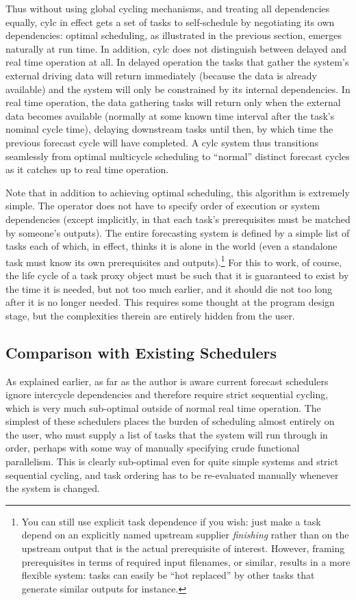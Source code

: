 \documentclass[11pt,a4paper]{article}
\begin{document}
Thus without using global cycling mechanisms, and treating all
dependencies equally, cylc in effect gets a set of tasks to
self-schedule by negotiating its own dependencies: optimal scheduling,
as illustrated in the previous section, emerges naturally at run time.
In addition, cylc does not distinguish between delayed and real time
operation at all. In delayed operation the tasks that gather the
system's external driving data will return immediately (because the data
is already available) and the system will only be constrained by its
internal dependencies. In real time operation, the data gathering tasks
will return only when the external data becomes available (normally at
some known time interval after the task's nominal cycle time), delaying
downstream tasks until then, by which time the previous forecast cycle
will have completed. A cylc system thus transitions seamlessly from
optimal multicycle scheduling to ``normal'' distinct forecast cycles as
it catches up to real time operation.

Note that in addition to achieving optimal scheduling, this algorithm is
extremely simple. The operator does not have to specify order of
execution or system dependencies (except implicitly, in that each task's
prerequisites must be matched by someone's outputs). The entire
forecasting system is defined by a simple list of tasks each of which,
in effect, thinks it is alone in the world (even a standalone task must
know its own prerequisites and outputs).\footnote{You can still use
explicit task dependence if you wish: just make a task depend on an
explicitly named upstream supplier {\em finishing} rather than on the
upstream output that is the actual prerequisite of interest. However,
framing prerequisites in terms of required input filenames, or similar,
results in a more flexible system: tasks can easily be ``hot replaced''
by other tasks that generate similar outputs for instance.}  For this to
work, of course, the life cycle of a task proxy object must be such that
it is guaranteed to exist by the time it is needed, but not too much
earlier, and it should die not too long after it is no longer needed.
This requires some thought at the program design stage, but the
complexities therein are entirely hidden from the user. 

\subsection{Comparison with Existing Schedulers}

As explained earlier, as far as the author is aware current forecast
schedulers ignore intercycle dependencies and therefore require
strict sequential cycling, which is very much sub-optimal outside of
normal real time operation. The simplest of these schedulers places the
burden of scheduling almost entirely on the user, who must supply a list
of tasks that the system will run through in order, perhaps with some
way of manually specifying crude functional parallelism.  This is
clearly sub-optimal even for quite simple systems and strict sequential
cycling, and task ordering has to be re-evaluated manually whenever the
system is changed. 
\end{document}
